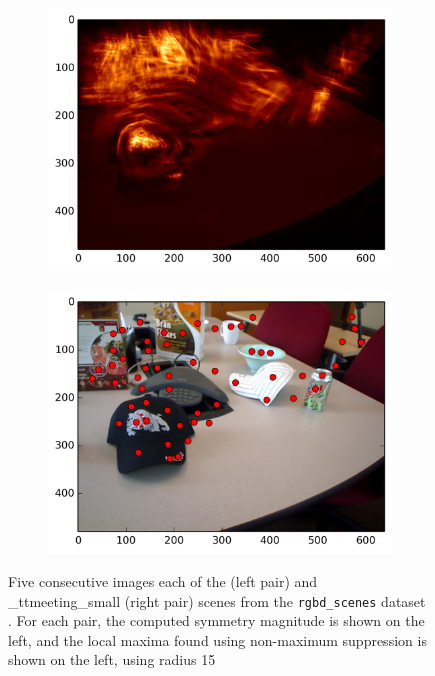 \begin{figure}[ht]
\begin{subfigure}[]{0.25\linewidth}\label{fig:meet_smag_4}\includegraphics[width=\linewidth]{figures/meeting_smag_9}\end{subfigure}%
\begin{subfigure}[]{0.25\linewidth}\label{fig:meet_feats_4}\includegraphics[width=\linewidth]{figures/meeting_feats_9}\end{subfigure}
\caption{Five consecutive images each of the  (left pair) and \text_tt{meeting\_small} (right pair) scenes from the \texttt{rgbd\_scenes} dataset \cite{Henry2012}. For each pair, the computed symmetry magnitude is shown on the left, and the local maxima found using non-maximum suppression is shown on the left, using radius 15}
\label{fig:ex_xforms}
\end{figure}

